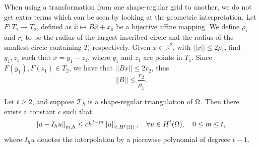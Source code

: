 When using a transformation from one shape-regular grid to another, we do not get extra terms which can be seen by looking at the geometric interpretation.
Let $F:T_1 \to T_2$, defined as $ \hat{x} \mapsto B\hat{x} + x_0$ be a bijective affine mapping. 
We define $\rho_i$ and $r_i$ to be the radius of the largest inscribed circle and the radius of the smallest circle containing $T_i$ respectively.
Given $x \in \mathbb{R}^2$, with $||x|| \leq 2 \rho_1$, find $y_1, z_1$ such that $x = y_1 - z_1$, where $y_1$ and $z_1$ are points in $T_1$. 
Since $F(y_1), F(z_1) \in T_2$, we have that $||Bx|| \leq 2r_2$, thus
\begin{equation}\label{eq:6.9}
    ||B|| \leq \frac{r_2}{\rho_1}. %
\end{equation}
\begin{thmx}{\quad\label{thm:6.4}}
    Let $t \geq 2$, and suppose $\mathcal{T}_h$ is a shape-regular triangulation of $\Omega$. Then there exists a constant $c$ such that
    \begin{equation}
        \norm{u - I_h u}_{m,h} \leq c h^{t-m} \norm{u}_{t, H^t(\Omega)}, \quad \forall u \in H^t(\Omega), \quad 0 \leq m \leq t,
        \label{eq:6.5}
    \end{equation}
    where $I_h u$ denotes the interpolation by a piecewise polynomial of degreee $t-1$.
\end{thmx}


